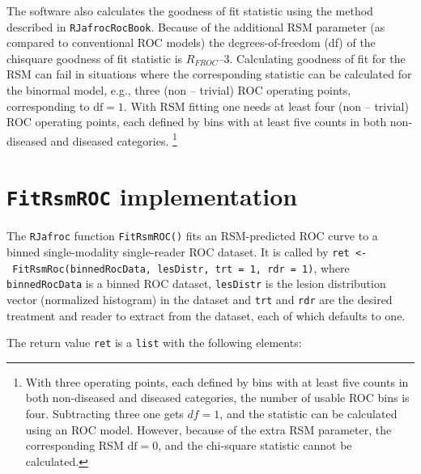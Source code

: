 \documentclass[
]{book}
\begin{document}
The software also calculates the goodness of fit statistic using the method described in \texttt{RJafrocRocBook}. Because of the additional RSM parameter (as compared to conventional ROC models) the degrees-of-freedom (df) of the chisquare goodness of fit statistic is \(R_{FROC} – 3\). Calculating goodness of fit for the RSM can fail in situations where the corresponding statistic can be calculated for the binormal model, e.g., three (non -- trivial) ROC operating points, corresponding to \(\text{df} = 1\). With RSM fitting one needs at least four (non -- trivial) ROC operating points, each defined by bins with at least five counts in both non-diseased and diseased categories. \footnote{With three operating points, each defined by bins with at least five counts in both non-diseased and diseased categories, the number of usable ROC bins is four. Subtracting three one gets \(df = 1\), and the statistic can be calculated using an ROC model. However, because of the extra RSM parameter, the corresponding RSM \(\text{df} = 0\), and the chi-square statistic cannot be calculated.}

\hypertarget{rsm-fitting-fitrsmroc-implementation}{%
\section{\texorpdfstring{\texttt{FitRsmROC} implementation}{FitRsmROC implementation}}\label{rsm-fitting-fitrsmroc-implementation}}

The \texttt{RJafroc} function \texttt{FitRsmROC()} fits an RSM-predicted ROC curve to a binned single-modality single-reader ROC dataset. It is called by \texttt{ret\ \textless{}-\ FitRsmRoc(binnedRocData,\ lesDistr,\ trt\ =\ 1,\ rdr\ =\ 1)}, where \texttt{binnedRocData} is a binned ROC dataset, \texttt{lesDistr} is the lesion distribution vector (normalized histogram) in the dataset and \texttt{trt} and \texttt{rdr} are the desired treatment and reader to extract from the dataset, each of which defaults to one.

The return value \texttt{ret} is a \texttt{list} with the following elements:
\end{document}
